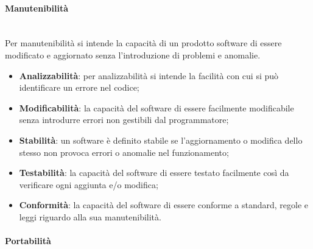 	\paragraph{Manutenibilità} \mbox{}\\
	Per manutenibilità si intende la capacità di un prodotto software di essere modificato e aggiornato senza l'introduzione di problemi e anomalie.
	\begin{itemize}
		\item \textbf{Analizzabilità}: per analizzabilità si intende la facilità con cui si può identificare un errore nel codice;
		\item \textbf{Modificabilità}: la capacità del software di essere facilmente modificabile senza introdurre errori non gestibili dal programmatore;
		\item \textbf{Stabilità}: un software è definito stabile se l'aggiornamento o modifica dello stesso non provoca errori o anomalie nel funzionamento;
		\item \textbf{Testabilità}: la capacità del software di essere testato facilmente così da verificare ogni aggiunta e/o modifica;
		\item \textbf{Conformità}: la capacità del software di essere conforme a standard, regole e leggi riguardo alla sua manutenibilità.
	\end{itemize}
	\paragraph{Portabilità} \mbox{}\\
	\begin{itemize}
	\end{itemize}
